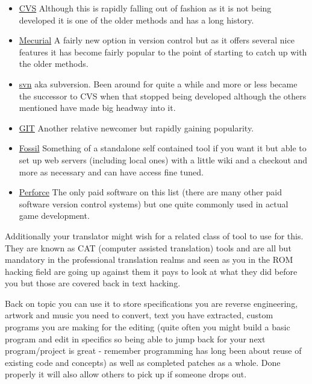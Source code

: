 \documentclass[
]{book}
\providecommand{\tightlist}{%
  \setlength{\itemsep}{0pt}\setlength{\parskip}{0pt}}
\begin{document}
\begin{itemize}
\tightlist
\item
  \href{http://savannah.nongnu.org/projects/cvs}{CVS} Although this is rapidly falling out of fashion as it is not being developed it is one of the older methods and has a long history.
\item
  \href{http://mercurial.selenic.com/}{Mecurial} A fairly new option in version control but as it offers several nice features it has become fairly popular to the point of starting to catch up with the older methods.
\item
  \href{http://subversion.apache.org/}{svn} aka subversion. Been around for quite a while and more or less became the successor to CVS when that stopped being developed although the others mentioned have made big headway into it.
\item
  \href{http://git-scm.com/}{GIT} Another relative newcomer but rapidly gaining popularity.
\item
  \href{http://www.fossil-scm.org/index.html/doc/trunk/www/index.wiki}{Fossil} Something of a standalone self contained tool if you want it but able to set up web servers (including local ones) with a little wiki and a checkout and more as necessary and can have access fine tuned.
\item
  \href{http://www.perforce.com/}{Perforce} The only paid software on this list (there are many other paid software version control systems) but one quite commonly used in actual game development.
\end{itemize}

Additionally your translator might wish for a related class of tool to use for this. They are known as CAT (computer assisted translation) tools and are all but mandatory in the professional translation realms and seen as you in the ROM hacking field are going up against them it pays to look at what they did before you but those are covered back in text hacking.

Back on topic you can use it to store specifications you are reverse engineering, artwork and music you need to convert, text you have extracted, custom programs you are making for the editing (quite often you might build a basic program and edit in specifics so being able to jump back for your next program/project is great - remember programming has long been about reuse of existing code and concepts) as well as completed patches as a whole. Done properly it will also allow others to pick up if someone drops out.
\end{document}
